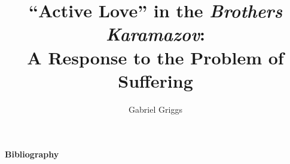 \documentclass[12pt]{report}
\begin{document}
    
       \graduationmonth{}
       \graduationyear{}
       \author{Gabriel Griggs}
       \committee{}{}{}{}{}
       \title{``Active Love'' in the \emph{Brothers Karamazov}: \\ A Response to the Problem of Suffering}



          \titlepage


\begin{acknowledgements}

     

\end{acknowledgements}

\pagebreak
\begingroup
\renewcommand{\section}[2]{}	%
\centerline{\textbf{Bibliography}} 
\end{document}
